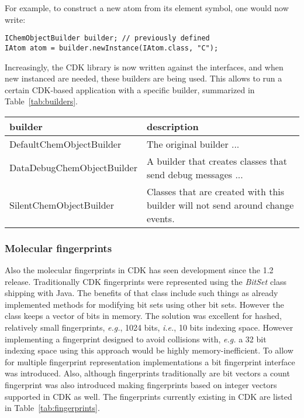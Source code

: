 \documentclass[10pt]{bmc_article}
\newenvironment{bmcformat}{\begin{raggedright}\baselineskip20pt\sloppy\setboolean{publ}{false}}{\end{raggedright}\baselineskip20pt\sloppy}
\begin{document}
\begin{bmcformat}
For example, to construct a new atom from its element symbol, one would now write:

\begin{verbatim}
IChemObjectBuilder builder; // previously defined
IAtom atom = builder.newInstance(IAtom.class, "C");
\end{verbatim}

Increasingly, the CDK library is now written against the interfaces, and when new instanced
are needed, these builders are being used. This allows to run a certain CDK-based
application with a specific builder, summarized in Table~\ref{tab:builders}.

\begin{table}
\begin{tabular}{l|l}
builder & description \\
\hline
DefaultChemObjectBuilder & The original builder ... \\
DataDebugChemObjectBuilder & A builder that creates classes that send debug messages ... \\
SilentChemObjectBuilder & Classes that are created with this builder will not
    send around change events. \\
\end{tabular}
\end{table}

\subsubsection*{Molecular fingerprints}
Also the molecular fingerprints in CDK has seen development since the 1.2
release. Traditionally CDK fingerprints were represented using the
\textit{BitSet} class shipping with Java. The benefits of that class include
such things as already implemented methods for modifying bit sets using other
bit sets. However the class keeps a vector of bits in memory. The solution was
excellent for hashed, relatively small fingerprints, \textit{e.g.}, 1024 bits,
\textit{i.e.}, 10 bits indexing space. However implementing a fingerprint
designed to avoid collisions with, \textit{e.g.} a 32 bit indexing space using
this approach would be highly memory-inefficient. To allow for multiple
fingerprint representation implementations a bit fingerprint interface was
introduced. Also, although fingerprints traditionally are bit vectors a count
fingerprint was also introduced making fingerprints based on integer vectors
supported in CDK as well. The fingerprints currently existing in CDK are listed
in Table~\ref{tab:fingerprints}.



\end{bmcformat}
\end{document}
